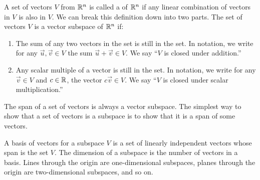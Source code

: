 A set of vectors $V$ from $\mathbb{R}^n$ is called a  of $\mathbb{R}^n$ if any linear combination of vectors in $V$ is also in $V$.  We can break this definition down into two parts.  The set of vectors $V$ is a vector subspace of $\mathbb{R}^n$ if:
\begin{enumerate}
	\item The sum of any two vectors in the set is still in the set. In notation, we write for any $\vec u,\vec v\in V$ the sum $\vec u+\vec v\in V$.  We say ``$V$ is closed under addition.''
	\item Any scalar multiple of a vector is still in the set. In notation, we write for any $\vec v\in V$ and $c\in \mathbb{R}$, the vector $c\vec v\in V$.  We say ``$V$ is closed under scalar multiplication.''
\end{enumerate}

The span of a set of vectors is always a vector subspace. The simplest way to show that a set of vectors is a subspace is to show that it is a span of some vectors.

A basis of vectors for a subspace $V$ is a set of linearly independent vectors whose span is the set $V$.  The dimension of a subspace is the number of vectors in a basis. Lines through the origin are one-dimensional subspaces, planes through the origin are two-dimensional subspaces, and so on.

